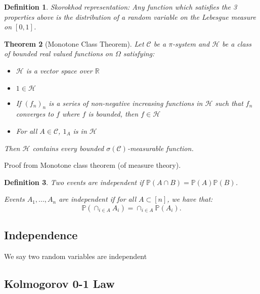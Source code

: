 \documentclass{article}
\newtheorem{theorem}{Theorem}
\newtheorem{definition}[theorem]{Definition}
\theoremstyle{definition}
\numberwithin{theorem}{section}
\numberwithin{equation}{section}
\begin{document}
\begin{definition}
	Skorokhod representation: Any function which satisfies the 3 properties above is the distribution of a random variable on the Lebesgue measure on $[0, 1]$.
\end{definition}

\begin{theorem}[Monotone Class Theorem]
	Let $\mathcal{C}$ be a $\pi$-system and $\mathcal{H}$ be a class of bounded real valued functions on $\Omega$ satisfying:
	\begin{itemize}
		\item $\mathcal{H}$ is a vector space over $\mathbb{R}$
		\item $1 \in \mathcal{H}$
		\item If $(f_n)_n$ is a series of non-negative increasing functions in $\mathcal{H}$ such that $f_n$ converges to $f$ where $f$ is bounded, then $f \in \mathcal{H}$
		\item For all $A \in \mathcal{C}$, $1_A$ is in $\mathcal{H}$
	\end{itemize}
	Then $\mathcal{H}$ contains every bounded $\sigma(\mathcal{C})$-measurable function. 
\end{theorem}
Proof from Monotone class theorem (of measure theory).

\begin{definition}
	Two events are independent if $\mathbb{P}(A \cap B) = \mathbb{P}(A) \mathbb{P}(B)$.
	
	Events $A_1, ..., A_n$ are independent if for all $A \subset [n]$, we have that:
	\begin{equation}
		\mathbb{P}(\cap_{i \in A} A_i) = \cap_{i \in A} \mathbb{P}(A_i).
	\end{equation}
\end{definition}

\subsection{Independence}
We say two random variables are independent 
 
\subsection{Kolmogorov 0-1 Law}
\end{document}
